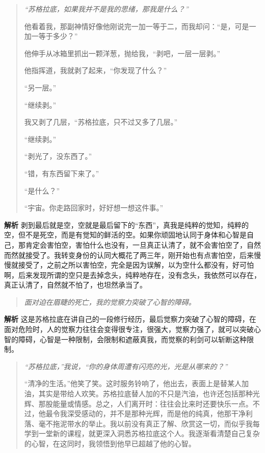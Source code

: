\begin{quotation}\it
    “苏格拉底，如果我并不是我的思绪，那我是什么？”

    他看着我，那副神情好像他刚说完一加一等于二，而我却问：“是，可是一加一等于多少？”

    他伸手从冰箱里抓出一颗洋葱，抛给我，“剥吧，一层一层剥。”

    他指挥道，我就剥了起来，“你发现了什么？”

    “另一层。”

    “继续剥。”

    我又剥了几层，“苏格拉底，只不过又多了几层。”

    “继续剥。”

    “剥光了，没东西了。”

    “错，有东西留下来了。”

    “是什么？”

    “宇宙。你走路回家时，好好想一想这件事。”
\end{quotation}

\textbf{解析} 剥到最后就是空，空就是最后留下的“东西”，真我是纯粹的觉知，纯粹的空，但不是死空，而是有觉知的鲜活的空。如果你顽固地认同于身体和心智是自己，那肯定会害怕空，害怕什么也没有，一旦真正认清了，就不会害怕空了，自然而然就接受了。我转变身份的认同大概花了两三年，刚开始也有点害怕空，后来慢慢就接受了，之前之所以害怕空，完全是因为误解，以为空什么都没有，好可怕啊，后来发现所谓的空只是去掉念头，纯粹地存在，没有念头，我依然可以存在，真正认清了，自然就不怕了，也坦然承当了。

\begin{quote}\it
    面对迫在眉睫的死亡，我的觉察力突破了心智的障碍。
\end{quote}

\textbf{解析} 这是苏格拉底在讲自己的一段修行经历，最后觉察力突破了心智的障碍，在面对危险时，人的觉察力往往会变得很专注，很强大，觉察力强了，就可以突破心智的障碍，心智是一种限制，会限制和遮蔽真我，而觉察的利剑可以斩断这种限制。

\begin{quotation}\it
    “苏格拉底，”我说，“你的身体周遭有闪亮的光，光是从哪来的？”

    “清净的生活。”他笑了笑。这时服务铃响了，他出去，表面上是替某人加油，其实是带给人欢笑。苏格拉底替人加的不只是汽油，也许还包括那种光辉、那股能量或情感。总之，人们离开时：往往会比来时还要快乐一点。不过，他最令我深受感动的，并不是那种光辉，而是他的纯真，他那干净利落、毫不拖泥带水的举止。我以前没有真正了解、欣赏这一切，而似乎我每学到一堂新的课程，就更深入洞悉苏格拉底这个人。我逐渐看清楚自己复杂的心智，在这同时，我领悟到他早已超越了他的心智。
\end{quotation}

